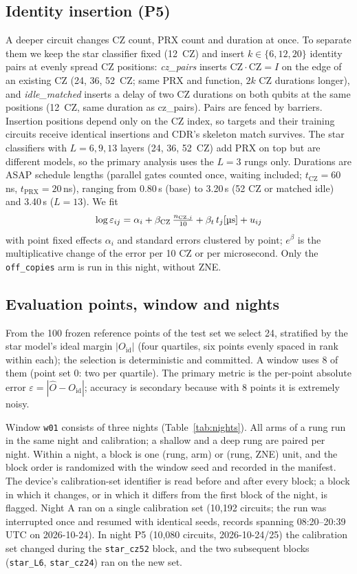 \documentclass[conference]{IEEEtran}
\newcommand{\Oid}{O_{\mathrm{id}}}
\newcommand{\CZ}{\mathrm{CZ}}
\newcommand{\arm}[1]{\texttt{#1}}
\begin{document}
\subsection{Identity insertion (P5)}
A deeper circuit changes CZ count, PRX count and duration at once. To separate them we keep
the star classifier fixed (12~CZ) and insert $k\in\{6,12,20\}$ identity pairs at evenly spread
CZ positions: \emph{cz\_pairs} inserts $\CZ\cdot\CZ=I$ on the edge of an existing CZ (24, 36,
52~CZ; same PRX and function, $2k$ CZ durations longer), and \emph{idle\_matched} inserts a
delay of two CZ durations on both qubits at the same positions (12~CZ, same duration as
cz\_pairs). Pairs are fenced by barriers. Insertion positions depend only on the CZ index, so
targets and their training circuits receive identical insertions and CDR's skeleton match
survives. The star classifiers with $L=6,9,13$ layers (24, 36, 52~CZ) add PRX on top but are
different models, so the primary analysis uses the $L=3$ rungs only. Durations are ASAP
schedule lengths (parallel gates counted once, waiting included; $t_{\text{CZ}}=60$\,ns,
$t_{\text{PRX}}=20$\,ns), ranging from 0.80\,\textmu s (base) to 3.20\,\textmu s (52 CZ or
matched idle) and 3.40\,\textmu s ($L=13$). We fit
\begin{equation}
  \log\varepsilon_{ij}=\alpha_i+\beta_{\text{CZ}}\,\tfrac{n_{\text{CZ},j}}{10}+\beta_t\,t_j[\text{\textmu s}]+u_{ij}
\end{equation}
with point fixed effects $\alpha_i$ and standard errors clustered by point; $e^\beta$ is the
multiplicative change of the error per 10 CZ or per microsecond. Only the
\arm{off\_copies} arm is run in this night, without ZNE.

\subsection{Evaluation points, window and nights}
From the 100 frozen reference points of the test set we select 24, stratified by the star
model's ideal margin $|\Oid|$ (four quartiles, six points evenly spaced in rank within each);
the selection is deterministic and committed. A window uses 8 of them (point set 0: two per
quartile). The primary metric is the per-point absolute error
$\varepsilon=|\hat O-\Oid|$; accuracy is secondary because with 8 points it is extremely noisy.

Window \texttt{w01} consists of three nights (Table~\ref{tab:nights}). All arms of a rung run
in the same night and calibration; a shallow and a deep rung are paired per night. Within a
night, a block is one (rung, arm) or (rung, ZNE) unit, and the block order is randomized with
the window seed and recorded in the manifest. The device's calibration-set identifier is read
before and after every block; a block in which it changes, or in which it differs from the
first block of the night, is flagged. Night A ran on a single calibration set
(10,192 circuits; the run was interrupted once and resumed with identical seeds, records
spanning 08:20--20:39 UTC on 2026-10-24). In night P5 (10,080 circuits, 2026-10-24/25) the
calibration set changed during the \texttt{star\_cz52} block, and the two subsequent blocks
(\texttt{star\_L6}, \texttt{star\_cz24}) ran on the new set.
\end{document}
